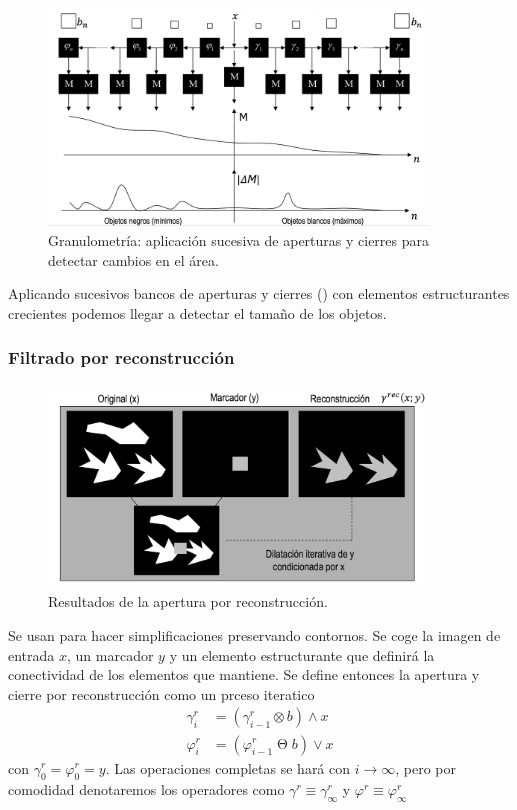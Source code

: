 \documentclass[nochap,palatino,notitlepage]{apuntes}
\DeclareMathOperator{\erd}{\Theta}
\begin{document}
\begin{figure}[hbtp]
\centering
\includegraphics[width=0.9\textwidth]{img/Granulometria.png}
\caption{Granulometría: aplicación sucesiva de aperturas y cierres para detectar cambios en el área.}
\label{fig:Granulometria}
\end{figure}

Aplicando sucesivos bancos de aperturas y cierres () con elementos estructurantes crecientes podemos llegar a detectar el tamaño de los objetos.

\subsubsection{Filtrado por reconstrucción}

\begin{figure}[hbtp]
\centering
\includegraphics[width=0.9\textwidth]{img/AperturaReconstruccion.png}
\caption{Resultados de la apertura por reconstrucción.}
\label{fig:AperturaReconstruccion}
\end{figure}

Se usan para hacer simplificaciones preservando contornos. Se coge la imagen de entrada $x$, un marcador $y$ y un elemento estructurante que definirá la conectividad de los elementos que mantiene. Se define entonces la apertura y cierre por reconstrucción como un prceso iteratico\begin{align*}
γ^r_i &= (γ^r_{i-1} \otimes b) \wedge x \\
φ^r_i &= (φ^r_{i-1} \erd b) \vee x
\end{align*} con $γ^r_0 = φ^r_0 = y$. Las operaciones completas se hará con $i \to ∞$, pero por comodidad denotaremos los operadores como $γ^r \equiv γ^r_{∞}$ y $φ^r \equiv φ^r_{∞}$
\end{document}
